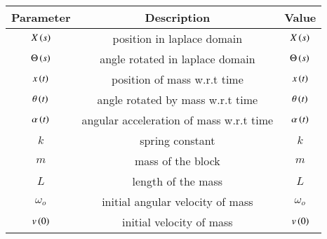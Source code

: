 \begin{tabular}{|c|c|c|}
    \hline
    \textbf{Parameter} & \textbf{Description} & \textbf{Value} \\
    \hline
    $X\left(s\right)$ & position in laplace domain & $ X\left(s\right)$ \\
    \hline
    $\Theta\left(s\right)$ & angle rotated in laplace domain & $ \Theta\left(s\right)$ \\
    \hline
    $x\left(t\right)$ & position of mass w.r.t time & $x\left(t\right)$ \\
    \hline
    $\theta\left(t\right)$ & angle rotated by mass w.r.t time &$ \theta\left(t\right)$\\
    \hline
    $\alpha\left(t\right)$ & angular acceleration of mass w.r.t time & $\alpha\left(t\right)$ \\
    \hline
    $k$ & spring constant & $ k$\\
    \hline
    $m$ & mass of the block & $ m$\\
    \hline
    $L$ & length of the mass & $ L$\\
    \hline
    $\omega_o$ & initial angular velocity of mass & $ \omega_o$ \\
    \hline
    $v\left(0\right)$ & initial velocity of mass& $ v\left(0\right)$ \\
    \hline
    
\end{tabular}





